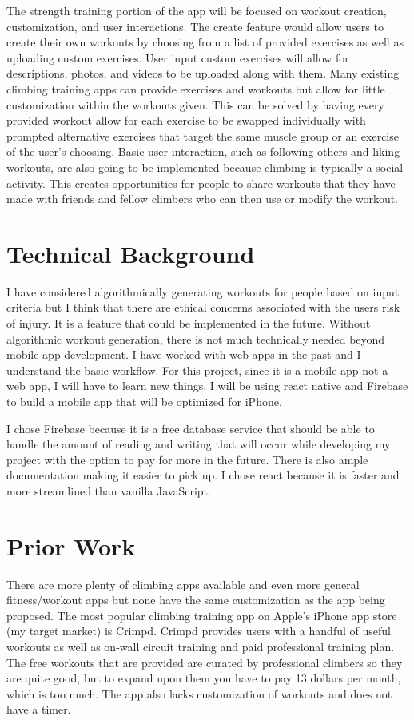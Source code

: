 \documentclass[10pt,twocolumn]{article}
\begin{document}
	The strength training portion of the app will be focused on workout creation, customization, and user interactions. The create feature would allow users to create their own workouts by choosing from a list of provided exercises as well as uploading custom exercises. User input custom exercises will allow for descriptions, photos, and videos to be uploaded along with them. Many existing climbing training apps can provide exercises and workouts but allow for little customization within the workouts given. This can be solved by having every provided workout allow for each exercise to be swapped individually with prompted alternative exercises that target the same muscle group or an exercise of the user’s choosing. Basic user interaction, such as following others and liking workouts, are also going to be implemented because climbing is typically a social activity. This creates opportunities for people to share workouts that they have made with friends and fellow climbers who can then use or modify the workout.
	
\section{Technical Background}

    I have considered algorithmically generating workouts for people based on input criteria but I think that there are ethical concerns associated with the users risk of injury. It is a feature that could be implemented in the future. Without algorithmic workout generation, there is not much technically needed beyond mobile app development. I have worked with web apps in the past and I understand the basic workflow. For this project, since it is a mobile app not a web app, I will have to learn new things. I will be using react native and Firebase to build a mobile app that will be optimized for iPhone.

    
    I chose Firebase because it is a free database service that should be able to handle the amount of reading and writing that will occur while developing my project with the option to pay for more in the future. There is also ample documentation making it easier to pick up. I chose react because it is faster and more streamlined than vanilla JavaScript. 


\section{Prior Work}

    There are more plenty of climbing apps available and even more general fitness/workout apps but none have the same customization as the app being proposed. The most popular climbing training app on Apple’s iPhone app store (my target market) is Crimpd. Crimpd provides users with a handful of useful workouts as well as on-wall circuit training and paid professional training plan. The free workouts that are provided are curated by professional climbers so they are quite good, but to expand upon them you have to pay 13 dollars per month, which is too much. The app also lacks customization of workouts and does not have a timer. 
\end{document}
